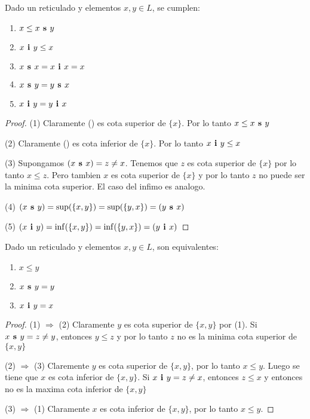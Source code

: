 \begin{lemma}
  Dado un reticulado \reticul y elementos $x, y \in L$, se cumplen:
  \begin{enumerate}
    \item $x \leq x\textbf{ s }y$
    \item $x\textbf{ i }y \leq x$
    \item $x\textbf{ s }x = x\textbf{ i }x = x$
    \item $x\textbf{ s }y = y\textbf{ s }x$
    \item $x\textbf{ i }y = y\textbf{ i }x$ 
  \end{enumerate}
\end{lemma}
\begin{proof}
  (1) Claramente () es cota superior de $\{x\}$. Por lo tanto $x \leq x\textbf{ s }y$
  
  (2) Claramente () es cota inferior de $\{x\}$. Por lo tanto $x\textbf{ i }y \leq x$
  
  (3) Supongamos $(x\textbf{ s }x) = z \neq x$. Tenemos que $z$ es cota superior de $\{x\}$ por lo tanto $x \leq z$.
  Pero tambien $x$ es cota superior de $\{x\}$ y por lo tanto $z$ no puede ser la minima cota superior. El caso del infimo es analogo.

  (4) $(x\textbf{ s }y) = \sup(\{x, y\}) = \sup(\{y, x\}) = (y\textbf{ s }x)$

  (5) $(x\textbf{ i }y) = \inf(\{x, y\}) = \inf(\{y, x\}) = (y\textbf{ i }x)$
\end{proof}

\begin{lemma}
  Dado un reticulado \reticul y elementos $x, y \in L$, son equivalentes:
  \begin{enumerate}
    \item $x \leq y$
    \item $x\textbf{ s }y = y$
    \item $x\textbf{ i }y = x$
  \end{enumerate}
\end{lemma}
\begin{proof}
  (1) $\Rightarrow$ (2) Claramente $y$ es cota superior de $\{x, y\}$ por (1). Si $x\textbf{ s }y=z\neq y$, entonces $y \leq z$ y por lo tanto $z$ no es la minima cota superior de $\{x, y\}$

  (2) $\Rightarrow$ (3) Claremente $y$ es cota superior de $\{x, y\}$, por lo tanto $x \leq y$. Luego se tiene que $x$ es cota inferior de $\{x, y\}$. Si $x\textbf{ i }y=z\neq x$, entonces $z \leq x$ y entonces no es la maxima cota inferior de $\{x, y\}$

  (3) $\Rightarrow$ (1) Claramente $x$ es cota inferior de $\{x, y\}$, por lo tanto $x \leq y$.
\end{proof}

